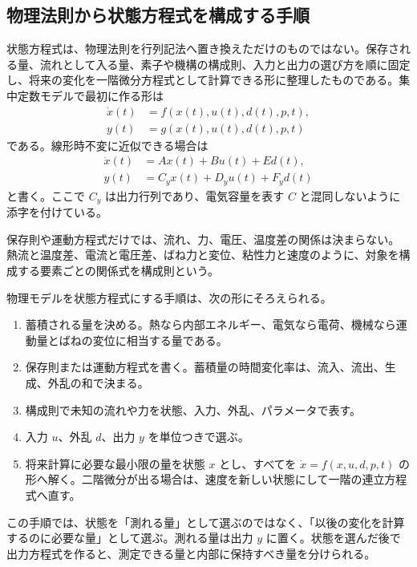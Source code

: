 \subsection{物理法則から状態方程式を構成する手順}

状態方程式は、物理法則を行列記法へ置き換えただけのものではない。保存される量、流れとして入る量、素子や機構の構成則、入力と出力の選び方を順に固定し、将来の変化を一階微分方程式として計算できる形に整理したものである。集中定数モデルで最初に作る形は
\begin{align}
  \dot{x}(t)&=f(x(t),u(t),d(t),p,t),\\
  y(t)&=g(x(t),u(t),d(t),p,t)
\end{align}
である。線形時不変に近似できる場合は
\begin{align}
  \dot{x}(t)&=Ax(t)+Bu(t)+Ed(t),\label{eq:physical-modeling-state-form}\\
  y(t)&=C_y x(t)+D_y u(t)+F_y d(t)
\end{align}
と書く。ここで $C_y$ は出力行列であり、電気容量を表す $C$ と混同しないように添字を付けている。

\begin{definition}[構成則]
保存則や運動方程式だけでは、流れ、力、電圧、温度差の関係は決まらない。熱流と温度差、電流と電圧差、ばね力と変位、粘性力と速度のように、対象を構成する要素ごとの関係式を構成則という。
\end{definition}

物理モデルを状態方程式にする手順は、次の形にそろえられる。

\begin{enumerate}
  \item 蓄積される量を決める。熱なら内部エネルギー、電気なら電荷、機械なら運動量とばねの変位に相当する量である。
  \item 保存則または運動方程式を書く。蓄積量の時間変化率は、流入、流出、生成、外乱の和で決まる。
  \item 構成則で未知の流れや力を状態、入力、外乱、パラメータで表す。
  \item 入力 $u$、外乱 $d$、出力 $y$ を単位つきで選ぶ。
  \item 将来計算に必要な最小限の量を状態 $x$ とし、すべてを $\dot{x}=f(x,u,d,p,t)$ の形へ解く。二階微分が出る場合は、速度を新しい状態にして一階の連立方程式へ直す。
\end{enumerate}

この手順では、状態を「測れる量」として選ぶのではなく、「以後の変化を計算するのに必要な量」として選ぶ。測れる量は出力 $y$ に置く。状態を選んだ後で出力方程式を作ると、測定できる量と内部に保持すべき量を分けられる。

